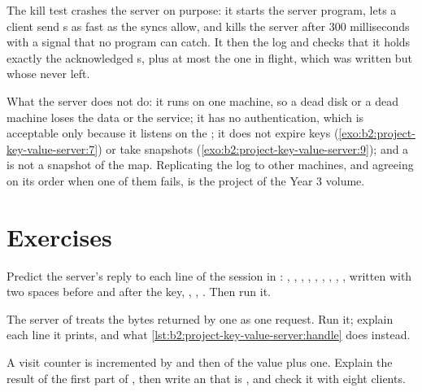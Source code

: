 The kill test crashes the server on purpose: it starts the server program, lets a client send
s as fast as the syncs allow, and kills the server after 300 milliseconds with a signal that no program can
catch. It then  the log and checks that it holds exactly the acknowledged s, plus at most the one in
flight, which was written but whose  never left.

What the server does not do: it runs on one machine, so a dead disk or a dead machine loses the data or the service; it
has no authentication, which is acceptable only because it listens on the ; it does not expire keys
(\cref{exo:b2:project-key-value-server:7}) or take snapshots (\cref{exo:b2:project-key-value-server:9}); and a
 is not a snapshot of the map. Replicating the log to other machines, and agreeing on its order when one of
them fails, is the project of the Year 3 volume.

\section{Exercises}\label{sec:b2:project-key-value-server:exercises}

\begin{exercise}[$\star$]\label{exo:b2:project-key-value-server:1}
Predict the server's reply to each line of the session in : , ,
, , , , , , , 
written with two spaces before and after the key, , , . Then run it.
\end{exercise}

\begin{exercise}[$\star$]\label{exo:b2:project-key-value-server:2}
The server of  treats the bytes returned by one  as one request. Run it; explain each
line it prints, and what \cref{lst:b2:project-key-value-server:handle} does instead.
\end{exercise}

\begin{exercise}[$\star$]\label{exo:b2:project-key-value-server:3}
A visit counter is incremented by  and then  of the value plus one. Explain the result of the first
part of , then write an  that is , and check it with eight clients.
\end{exercise}

